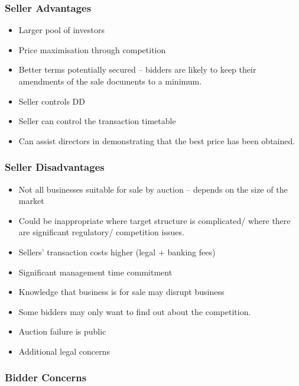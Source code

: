 \documentclass[
]{article}
\providecommand{\tightlist}{%
  \setlength{\itemsep}{0pt}\setlength{\parskip}{0pt}}
\begin{document}
\hypertarget{seller-advantages}{%
\subsubsection{Seller Advantages}\label{seller-advantages}}

\begin{itemize}
\tightlist
\item
  Larger pool of investors
\item
  Price maximisation through competition
\item
  Better terms potentially secured -- bidders are likely to keep their
  amendments of the sale documents to a minimum.
\item
  Seller controls DD
\item
  Seller can control the transaction timetable
\item
  Can assist directors in demonstrating that the best price has been
  obtained.
\end{itemize}

\hypertarget{seller-disadvantages}{%
\subsubsection{Seller Disadvantages}\label{seller-disadvantages}}

\begin{itemize}
\tightlist
\item
  Not all businesses suitable for sale by auction -- depends on the size
  of the market
\item
  Could be inappropriate where target structure is complicated/ where
  there are significant regulatory/ competition issues.
\item
  Sellers' transaction costs higher (legal + banking fees)
\item
  Significant management time commitment
\item
  Knowledge that business is for sale may disrupt business
\item
  Some bidders may only want to find out about the competition.
\item
  Auction failure is public
\item
  Additional legal concerns
\end{itemize}

\hypertarget{bidder-concerns}{%
\subsubsection{Bidder Concerns}\label{bidder-concerns}}
\end{document}
